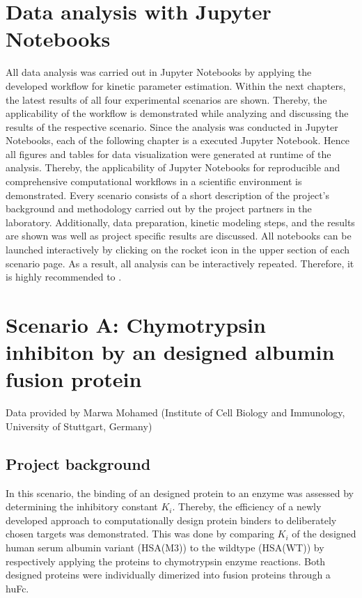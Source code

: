 \documentclass[letterpaper,12pt,english]{jupyterBook}
\begin{document}
\section{Data analysis with Jupyter Notebooks}
\label{\detokenize{results:data-analysis-with-jupyter-notebooks}}
\sphinxAtStartPar
All data analysis was carried out in Jupyter Notebooks by applying the developed workflow for kinetic parameter estimation. Within the next chapters, the latest results of all four experimental scenarios are shown. Thereby, the applicability of the workflow is demonstrated while analyzing and discussing the results of the respective scenario.
Since the analysis was conducted in Jupyter Notebooks, each of the following chapter is a executed Jupyter Notebook. Hence all figures and tables for data visualization were generated at runtime of the analysis.
Thereby, the applicability of Jupyter Notebooks for reproducible and comprehensive computational workflows in a scientific environment is demonstrated.
Every scenario consists of a short description of the project’s background and methodology carried out by the project partners in the laboratory. Additionally, data preparation, kinetic modeling steps, and the results are shown was well as project specific results are discussed.
All notebooks can be launched interactively by clicking on the rocket icon in the upper section of each scenario page. As a result, all analysis can be interactively repeated. Therefore, it is highly recommended to .

\sphinxstepscope


\section{Scenario A: Chymotrypsin inhibiton by an  designed albumin fusion protein}
\label{\detokenize{scenarios/chymotrypsin_inhibition:scenario-a-br-chymotrypsin-inhibiton-by-an-in-silico-designed-albumin-fusion-protein}}\label{\detokenize{scenarios/chymotrypsin_inhibition::doc}}
\sphinxAtStartPar
Data provided by Marwa Mohamed (Institute of Cell Biology and Immunology, University of Stuttgart, Germany)


\subsection{Project background}
\label{\detokenize{scenarios/chymotrypsin_inhibition:project-background}}
\sphinxAtStartPar
In this scenario, the binding of an  designed protein to an enzyme was assessed by determining the inhibitory constant \(K_{i}\). Thereby, the efficiency of a newly developed approach to computationally design protein binders to deliberately chosen targets was demonstrated.
This was done by comparing \(K_{i}\) of the designed human serum albumin variant (HSA(M3)) to the wild\sphinxhyphen{}type (HSA(WT)) by respectively applying the proteins to chymotrypsin enzyme reactions. Both designed proteins were individually dimerized into fusion proteins through a huFc.
\end{document}
